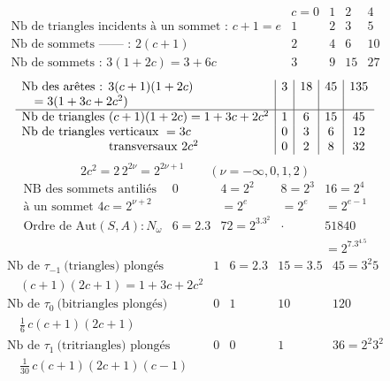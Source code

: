\documentclass[11pt,a4paper]{article}
\begin{document}

\[
  \begin{array}{l|c|c|c|c}
   & c=0 & 1 & 2 & 4\\\hline
  \text{Nb de triangles incidents à un sommet : } c+1=e & 1 & 2 & 3 & 5\\
  \text{Nb de sommets —— : } 2(c+1) & 2 & 4 & 6 & 10\\
  \text{Nb de sommets : } 3(1+2c)=3+6c & 3 & 9 & 15 & 27
  \end{array}
\]
\[
  \begin{array}{l|c|c|c|c}
  \text{Nb des arêtes : } 3(c+1)(1+2c) & 3 & 18 & 45 & 135\\
  \quad =3(1+3c+2c^2) & & & & \\\hline
  \text{Nb de triangles } (c+1)(1+2c)=1+3c+2c^2 & 1 & 6 & 15 & 45\\
  \text{Nb de triangles verticaux } =3c & 0 & 3 & 6 & 12\\
  \text{\phantom{Nb de triangles} transversaux } 2c^2 & 0 & 2 & 8 & 32
  \end{array}
\]
\[
  2c^2=2\,2^{2\nu}=2^{2\nu+1}\qquad(\nu=-\infty,0,1,2)
\]
\[
  \begin{array}{l|c|c|c|c}
  \text{NB des sommets antiliés}
   & 0 & 4=2^2 & 8=2^3 & 16=2^4\\
  \text{à un sommet } 4c=2^{\nu+2} & & =2^e & =2^e & =2^{e-1}\\\hline
  \text{Ordre de } \mathrm{Aut}(S,A) : N_\omega & 6=2.3 & 72=2^3.3^2 & \cdot & 51840\\
   & & & & =2^7.3^4.5
  \end{array}
\]
\[
  \begin{array}{l|c|c|c|c}
  \text{Nb de } \tau_{-1}\ \text{(triangles) plongés}
   & 1 & 6=2.3 & 15=3.5 & 45=3^2 5\\
  \quad (c+1)(2c+1)=1+3c+2c^2 & & & & \\
  \text{Nb de } \tau_0\ \text{(bitriangles plongés)}
   & 0 & 1 & 10 & 120\\
  \quad \tfrac16\,c(c+1)(2c+1) & & & & \\
  \text{Nb de } \tau_1\ \text{(tritriangles) plongés}
   & 0 & 0 & 1 & 36=2^2 3^2\\
  \quad \tfrac1{30}\,c(c+1)(2c+1)(c-1) & & & &
  \end{array}
\]
\end{document}
